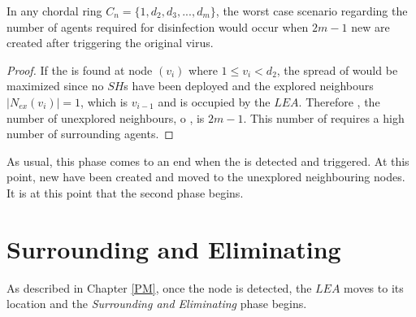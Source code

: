  
\begin{theorem}

In any  chordal ring $C_n=\{1,d_2,d_3,...,d_m\}$, the worst case scenario regarding the number of agents required for disinfection would occur when $2m-1$ new \bvs are created after triggering the original virus.
\end{theorem}
\begin{proof}
If the \bv is found at node $(v_i)$ where $1\leq v_i< d_2$, the spread of \bvs would be maximized since no $SH$s have been deployed and the explored neighbours $|N_{ex}(v_i)|=1$, which is $v_{i-1}$ and  is occupied by the  $LEA$. Therefore , the number of unexplored neighbours, o \bvs, is $2m-1$. This number of \bvs requires a high number of surrounding agents. 
\end{proof}



As usual, this phase comes to an end when the \bv is detected and triggered. At this point, new \bvs have been created and moved to the unexplored neighbouring nodes. It is at this point that the second phase begins. 



\section{Surrounding and Eliminating}
 
As described in Chapter \ref{PM}, once the \bv node is detected, the $LEA$ moves to its location and the {\em Surrounding and Eliminating} phase begins.
%
%
%

